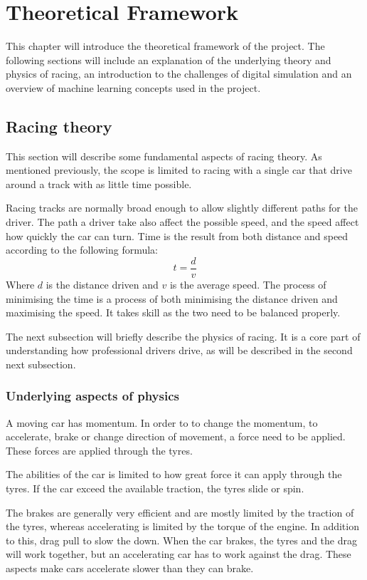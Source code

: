 \chapter{Theoretical Framework}
This chapter will introduce the theoretical framework of the project. The following sections will include an explanation of the underlying theory and physics of racing, an introduction to the challenges of digital simulation and an overview of machine learning concepts used in the project. 

\section{Racing theory}
This section will describe some fundamental aspects of racing theory. As mentioned previously, the scope is limited to racing with a single car that drive around a track with as little time possible.

Racing tracks are normally broad enough to allow slightly different paths for the driver. The path a driver take also affect the possible speed, and the speed affect how quickly the car can turn. Time is the result from both distance and speed according to the following formula:
\begin{equation}
t = \frac{d}{v}
\end{equation}
Where $d$ is the distance driven and $v$ is the average speed. The process of minimising the time is a process of both minimising the distance driven and maximising the speed. It takes skill as the two need to be balanced properly.

The next subsection will briefly describe the physics of racing. It is a core part of understanding how professional drivers drive, as will be described in the second next subsection.

\subsection{Underlying aspects of physics}
A moving car has momentum. In order to to change the momentum, to accelerate, brake or change direction of movement, a force need to be applied. These forces are applied through the tyres. 

The abilities of the car is limited to how great force it can apply through the tyres. If the car exceed the available traction, the tyres slide or spin. 

The brakes are generally very efficient and are mostly limited by the traction of the tyres, whereas accelerating is limited by the torque of the engine. In addition to this, drag pull to slow the down. When the car brakes, the tyres and the drag will work together, but an accelerating car has to work against the drag. These aspects make cars accelerate slower than they can brake.

